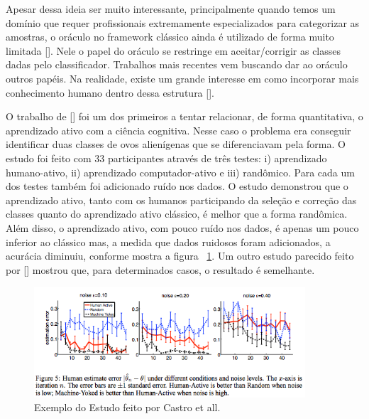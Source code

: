 Apesar dessa ideia ser muito interessante, principalmente quando temos um domínio que requer profissionais extremamente especializados para categorizar as amostras, o oráculo no framework clássico ainda é utilizado de forma muito limitada [\cite{seifert2010user}]. Nele o papel do oráculo se restringe em aceitar/corrigir as classes dadas pelo classificador. Trabalhos mais recentes vem buscando dar ao oráculo outros papéis. Na realidade, existe um grande interesse em como incorporar mais conhecimento humano dentro dessa estrutura [\cite{settles2014active}]. 

O trabalho de [\cite{castro2009human}] foi um dos primeiros a tentar relacionar, de forma quantitativa, o aprendizado ativo com a ciência cognitiva. Nesse caso o problema era conseguir identificar duas classes de ovos alienígenas que se diferenciavam pela forma. O estudo foi feito com 33 participantes através de três testes: i) aprendizado humano-ativo, ii) aprendizado computador-ativo e iii) randômico. Para cada um dos testes também foi adicionado ruído nos dados. O estudo demonstrou que o aprendizado ativo, tanto com os humanos participando da seleção e correção das classes quanto do aprendizado ativo clássico, é melhor que a forma randômica. Além disso, o aprendizado ativo, com pouco ruído nos dados, é apenas um pouco inferior ao clássico mas, a medida que dados ruidosos foram adicionados, a acurácia diminuiu, conforme mostra a figura ~\ref{fig:human_active_learning_graph}. Um outro estudo parecido feito por [\cite{markant2014better}] mostrou que, para determinados casos, o resultado é semelhante.

\begin{figure}
  \centering
  \includegraphics[width=0.9\textwidth]{figures/human_active_learning_graph.png}
  \caption{Exemplo do Estudo feito por Castro et all.}
  \label{fig:human_active_learning_graph}
\end{figure}



